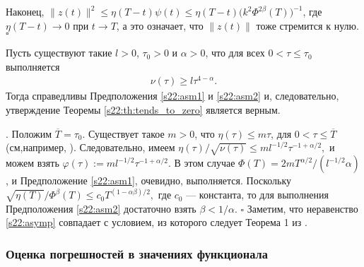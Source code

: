 \documentclass[../main.tex]{subfiles}
\begin{document}
Наконец, $ \|z(t)\|^2 \leqslant \eta(T-t)\psi(t) \leqslant \eta(T-t)\big(k^2\Phi^{2\beta}(T)\big)^{-1} $, 
где $\eta(T-t) \to 0$ при $t \to T$, а это означает, что $\|z(t)\|$ тоже стремится к нулю.
 \hfill $ \square $
\begin{corollary}%
Пусть существуют такие $ l > 0$, $\tau_0 > 0$ и $\alpha > 0$, что для всех $0 < \tau \leqslant \tau_0 $ выполняется
 \begin{gather}\label{s22:asymp}
 \nu(\tau)\geqslant l\tau^{4-\alpha}.
 \end{gather}
 Тогда справедливы Предположения \ref{s22:asm1} и \ref{s22:asm2} и, следовательно, утверждение Теоремы \ref{s22:th:tends_to_zero} является верным.
\end{corollary}
\doc. 
Положим $\overline{T}=\tau_0$. 
Существует такое $m>0$, что $\eta(\tau)\leqslant m \tau$, для $0 < \tau \leqslant\overline{T}$ (см,например, \cite{GusevOsipov}). 
Следовательно, имеем $
\eta(\tau)/\sqrt{\nu(\tau)} \leqslant 
 ml^{-1/2}\tau^{-1+\alpha/2},$
и можем взять $\varphi(\tau):= 
 ml^{-1/2}\tau^{-1+\alpha/2}$. 
В этом случае 
$\Phi(T)=2mT^{\alpha/2}/(l^{-1/2}\alpha)$, и Предположение \ref{s22:asm1}, очевидно, выполняется. 
Поскольку 
$\sqrt{\eta(T)}/\Phi^\beta(T) \leqslant c_0T^{(1-\alpha\beta)/2},$
где $c_0$ --- константа, то для выполнения Предположения \ref{s22:asm2} достаточно взять $\beta < 1/\alpha$.
 \hfill $ \square $
Заметим, что неравенство \eqref{s22:asymp} совпадает с условием, из которого следует Теорема 1 из \cite{GusevOsipov}.

\subsubsection{Оценка погрешностей в значениях функционала}
\end{document}
